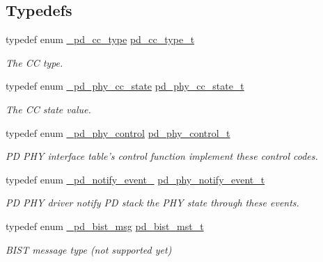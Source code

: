 \subsection*{Typedefs}
\begin{DoxyCompactItemize}
\item 
typedef enum \hyperlink{group__usb__pd__phy__drv_gab23c0fba94b457218944bc5284d0d08d}{\-\_\-pd\-\_\-cc\-\_\-type} \hyperlink{group__usb__pd__phy__drv_ga904cdd5d0d1e7026282617a10fe8a4c9}{pd\-\_\-cc\-\_\-type\-\_\-t}
\begin{DoxyCompactList}\small\item\em The C\-C type. \end{DoxyCompactList}\item 
typedef enum \hyperlink{group__usb__pd__phy__drv_ga09172da56b484f99a2ee891e75882faa}{\-\_\-pd\-\_\-phy\-\_\-cc\-\_\-state} \hyperlink{group__usb__pd__phy__drv_ga33106675227396a51d78ea6a7f562570}{pd\-\_\-phy\-\_\-cc\-\_\-state\-\_\-t}
\begin{DoxyCompactList}\small\item\em The C\-C state value. \end{DoxyCompactList}\item 
typedef enum \hyperlink{group__usb__pd__phy__drv_gab8bfca50e2ac042b47a697c88f84c3ed}{\-\_\-pd\-\_\-phy\-\_\-control} \hyperlink{group__usb__pd__phy__drv_ga5e3d7eb2cdbc2e45efca5e3e63d14baf}{pd\-\_\-phy\-\_\-control\-\_\-t}
\begin{DoxyCompactList}\small\item\em P\-D P\-H\-Y interface table's control function implement these control codes. \end{DoxyCompactList}\item 
typedef enum \hyperlink{group__usb__pd__phy__drv_ga9e1e6534f05a5dfae46d27dbf43e0455}{\-\_\-pd\-\_\-notify\-\_\-event\-\_\-} \hyperlink{group__usb__pd__phy__drv_ga08a2ea1727987dec255c30cdea6396fa}{pd\-\_\-phy\-\_\-notify\-\_\-event\-\_\-t}
\begin{DoxyCompactList}\small\item\em P\-D P\-H\-Y driver notify P\-D stack the P\-H\-Y state through these events. \end{DoxyCompactList}\item 
typedef enum \hyperlink{group__usb__pd__phy__drv_ga6e9f5312eacb47634a8cb7a9ef88ea2e}{\-\_\-pd\-\_\-bist\-\_\-msg} \hyperlink{group__usb__pd__phy__drv_ga311e952eb852cd3570504fe0699d10ec}{pd\-\_\-bist\-\_\-mst\-\_\-t}
\begin{DoxyCompactList}\small\item\em B\-I\-S\-T message type (not supported yet) \end{DoxyCompactList}\item 

\end{DoxyCompactItemize}

